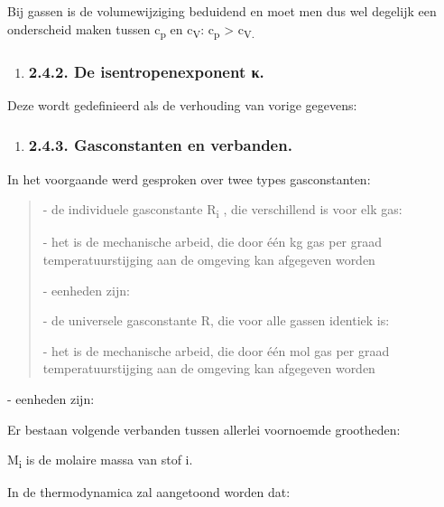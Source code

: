 \documentclass[]{article}
\begin{document}
Bij gassen is de volumewijziging beduidend en moet men dus wel degelijk
een onderscheid maken tussen c\textsubscript{p} en c\textsubscript{V}:
c\textsubscript{p} \textgreater{} c\textsubscript{V.}

\begin{enumerate}
\item
  \subsubsection{}\label{section-5}

  \subsubsection{2.4.2. De isentropenexponent
  κ.}\label{de-isentropenexponent-ux3ba.}
\end{enumerate}

Deze wordt gedefinieerd als de verhouding van vorige gegevens:

\begin{enumerate}
\item
  \subsubsection{2.4.3. Gasconstanten en
  verbanden.}\label{gasconstanten-en-verbanden.}
\end{enumerate}

In het voorgaande werd gesproken over twee types gasconstanten:

\begin{quote}
- de individuele gasconstante R\textsubscript{i} , die verschillend is
voor elk gas:

- het is de mechanische arbeid, die door één kg gas per graad
temperatuurstijging aan de omgeving kan afgegeven worden

- eenheden zijn:

- de universele gasconstante R, die voor alle gassen identiek is:

- het is de mechanische arbeid, die door één mol gas per graad
temperatuurstijging aan de omgeving kan afgegeven worden
\end{quote}

- eenheden zijn:

Er bestaan volgende verbanden tussen allerlei voornoemde grootheden:

M\textsubscript{i} is de molaire massa van stof i.

In de thermodynamica zal aangetoond worden dat:
\end{document}
